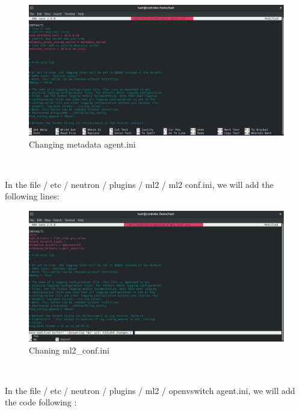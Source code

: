 \begin{spacing}{1.2}
\\
\begin{figure}[!htb] 
\begin{center} 
\includegraphics[width=1\linewidth]{Cloud/Installing and Configuring Neutron services/Changing metadata_agent.ini} 
\end{center} 
\caption{Changing metadata agent.ini} 
\end{figure} 
\FloatBarrier
\\
\par In the file / etc / neutron / plugins / ml2 / ml2 conf.ini, we will add the following lines:
\\
\begin{figure}[!htb] 
\begin{center} 
\includegraphics[width=1\linewidth]{Cloud/Installing and Configuring Neutron services/Chaning ml2_conf.ini} 
\end{center} 
\caption{Chaning ml2_conf.ini} 
\end{figure} 
\FloatBarrier
\\
\par In the file / etc / neutron / plugins / ml2 / openvswitch agent.ini, we will add the code
following :
\\

\end{spacing}
